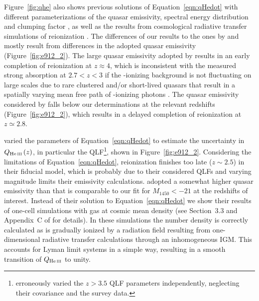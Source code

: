 \documentclass[fleqn,usenatbib]{mnras}
\begin{document}
Figure~\ref{fig:qhe} also shows previous solutions of
Equation~\eqref{eqn:qHedot} with different parameterizations of the
quasar emissivity, spectral energy distribution and clumping factor
\citep{2012ApJ...746..125H, 2015ApJ...813L...8M, 2016ApJ...828...90L,
  2018arXiv180104931P}, as well as the results from cosmological
radiative transfer simulations of  reionization
\citep{2009ApJ...694..842M,2014MNRAS.445.4186C}.  The differences of
our results to the ones by \citet{2012ApJ...746..125H} and
\citet{2015ApJ...813L...8M} mostly result from differences in the
adopted quasar emissivity (Figure~\ref{fig:e912_2}).  The large quasar
emissivity adopted by \citet{2015ApJ...813L...8M} results in an early
completion of  reionization at $z\approx 4$, which is
inconsistent with the measured strong  absorption at
$2.7<z<3$ \citep{2016ApJ...825..144W, 2018MNRAS.473.1416M,
  2018arXiv180104931P} if the -ionizing background is not
fluctuating on large scales due to rare clustered and/or short-lived
quasars that result in a spatially varying mean free path of
-ionizing photons \citep{2010ApJ...714..355F,
  2014MNRAS.440.2406M, 2014MNRAS.437.1141D, 2017MNRAS.465.2886D}.  The
quasar emissivity considered by \citet{2012ApJ...746..125H} falls
below our determinations at the relevant redshifts
(Figure~\ref{fig:e912_2}), which results in a delayed completion of
 reionization at $z\simeq 2.8$.

\citet{2016ApJ...828...90L} varied the parameters of
Equation~\eqref{eqn:qHedot} to estimate the uncertainty in
$Q_\ion{He}{iii}\left(z\right)$, in particular the
QLF\footnote{\citet{2016ApJ...828...90L} erroneously varied the
  $z>3.5$ QLF parameters independently, neglecting their covariance
  and the survey data.}, shown in Figure~\ref{fig:e912_2}.
Considering the limitations of Equation~\eqref{eqn:qHedot},
 reionization finishes too late ($z\sim 2.5$) in their
fiducial model, which is probably due to their considered QLFs and
varying magnitude limits their emissivity calculations.
\citet{2018arXiv180104931P} adopted a somewhat higher quasar
emissivity than \citet{2012ApJ...746..125H} that is comparable to our
fit for $M_{1450}<-21$ at the redshifts of interest.  Instead of their
solution to Equation~\eqref{eqn:qHedot} we show their results of
one-cell simulations with gas at cosmic mean density (see Section~3.3
and Appendix~C of \citealt{2018arXiv180104931P} for details).  In
these simulations the  number density is correctly
calculated as  is gradually ionized by a radiation field
resulting from one-dimensional radiative transfer calculations through
an inhomogeneous IGM.  This accounts for  Lyman limit
systems in a simple way, resulting in a smooth transition of
$Q_\ion{He}{iii}$ to unity.
\end{document}
